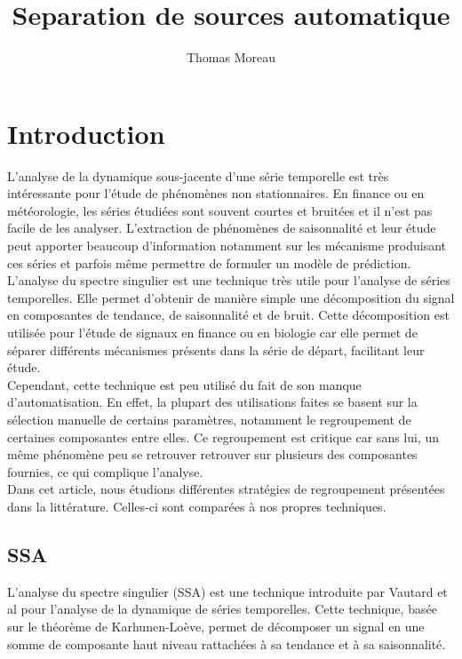\documentclass{gretsi}
\title{Separation de sources automatique}
\author{Thomas Moreau}
\date{}
\begin{document}
\maketitle


\section{Introduction}

L'analyse de la dynamique sous-jacente d'une série temporelle est très intéressante pour l'étude de phénomènes non stationnaires. En finance ou en météorologie, les séries étudiées sont souvent courtes et bruitées et il n'est pas facile de les analyser. L'extraction de phénomènes de saisonnalité et leur étude peut apporter beaucoup d'information notamment sur les mécanisme produisant ces séries et parfois même permettre de formuler un modèle de prédiction.\\

L'analyse du spectre singulier est une technique très utile pour l'analyse de séries temporelles. Elle permet d'obtenir de manière simple une décomposition du signal en composantes de tendance, de saisonnalité et de bruit. Cette décomposition est utilisée pour l'étude de signaux en finance ou en biologie car elle permet de séparer différents mécanismes présents dans la série de départ, facilitant leur étude.\\

Cependant, cette technique est peu utilisé du fait de son manque d'automatisation. En effet, la plupart des utilisations faites se basent sur la sélection manuelle de certains paramètres, notamment le regroupement de certaines composantes entre elles. Ce regroupement est critique car sans lui, un même phénomène peu se retrouver retrouver sur plusieurs des composantes fournies, ce qui complique l'analyse.\\

Dans cet article, nous étudions différentes stratégies de regroupement présentées dans la littérature. Celles-ci sont comparées à nos propres techniques.

\subsection{SSA}

L'analyse du spectre singulier (SSA) est une technique introduite par Vautard et al \cite{vautard_ghil_89_SSA} pour l'analyse de la dynamique de séries temporelles. Cette technique, basée sur le théorème de Karhunen-Loève, permet de décomposer un signal en une somme de composante haut niveau rattachées à sa tendance et à sa saisonnalité.
\end{document}
